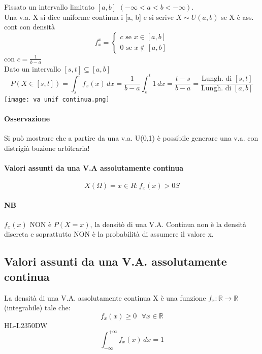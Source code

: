 \documentclass[12pt, a4paper, openany]{book}
\begin{document}

Fissato un intervallo limitato $[a, b]$ $(-\infty < a < b < -\infty)$.
\\ Una v.a. X si dice uniforme continua i [a, b] e si scrive $X \sim U(a, b)$
se X è ass. cont con densità
\begin{equation*}
    f_x^{x} =
    \begin{cases}
        c \text{ se } x \in [a, b]\\
        0 \text{ se } x \notin [a, b]
    \end{cases} 
\end{equation*}
con $c = \frac{1}{b-a}$
\\ Dato un intervallo $[s, t] \subseteq [a, b]$
\begin{equation*}
    P(X \in [s,t]) = \int_s^t f_x (x) \,dx = 
    \frac{1}{b -a} \int_s^t 1 \,dx = \frac{t-s}{b-a} =
    \frac{\text{Lungh. di } [s,t]}{\text{Lungh. di } [a, b]}
\end{equation*} 
\texttt{[image: va unif continua.png]}
\paragraph*{Osservazione} Si può mostrare che a partire da una v.a. U(0,1) è possibile
generare una v.a. con distrigià buzione arbitraria!

\paragraph*{Valori assunti da una V.A assolutamente continua}
\begin{equation*}
    X(\Omega) = {x \in R: f_x(x) > 0S}
\end{equation*}

\paragraph{NB} $f_x(x)$ NON è $P(X=x)$, la densitò di una V.A. Continua non è la densità discreta 
e soprattutto NON è la probabilità di assumere il valore x.

\subsection{Valori assunti da una V.A. assolutamente continua}
La densità di una V.A. assolutamente continua X è una funzione $f_x:\mathbb{R} \rightarrow \mathbb{R}$ (integrabile)
tale che:
\begin{equation*}
    f_x(x) \geq 0 \textrm{ } \forall x \in  \mathbb{R}
\end{equation*}HL-L2350DW
\begin{equation*}
    \int_{-\infty}^{+\infty} f_x(x)  \,dx = 1
\end{equation*}
\end{document}
